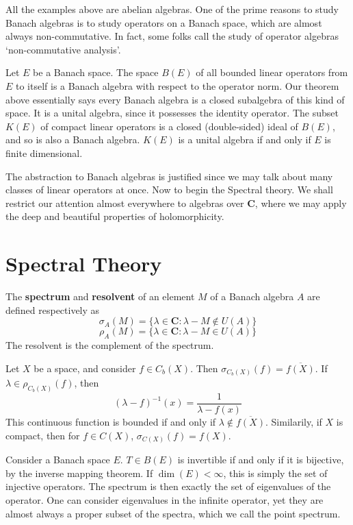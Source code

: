 All the examples above are abelian algebras. One of the prime reasons to study Banach algebras is to study operators on a Banach space, which are almost always non-commutative. In fact, some folks call the study of operator algebras `non-commutative analysis'.

\begin{example}
    Let $E$ be a Banach space. The space $B(E)$ of all bounded linear operators from $E$ to itself is a Banach algebra with respect to the operator norm. Our theorem above essentially says every Banach algebra is a closed subalgebra of this kind of space. It is a unital algebra, since it possesses the identity operator. The subset $K(E)$ of compact linear operators is a closed (double-sided) ideal of $B(E)$, and so is also a Banach algebra. $K(E)$ is a unital algebra if and only if $E$ is finite dimensional.
\end{example}

The abstraction to Banach algebras is justified since we may talk about many classes of linear operators at once. Now to begin the Spectral theory. We shall restrict our attention almost everywhere to algebras over $\mathbf{C}$, where we may apply the deep and beautiful properties of holomorphicity.

\section{Spectral Theory}

\begin{definition}
    The {\bf spectrum} and {\bf resolvent} of an element $M$ of a Banach algebra $A$ are defined respectively as
    \[ \sigma_{A}(M) = \{ \lambda \in \mathbf{C} : \lambda - M \not \in U(A) \} \]
    \[ \rho_{A}(M) = \{ \lambda \in \mathbf{C} : \lambda - M \in U(A) \} \]
    The resolvent is the complement of the spectrum.
\end{definition}

\begin{example}
    Let $X$ be a space, and consider $f \in C_b(X)$. Then $\sigma_{C_b(X)}(f) = \overline{f(X)}$. If $\lambda \in \rho_{C_b(X)}(f)$, then
    \[ (\lambda - f)^{-1}(x) = \frac{1}{\lambda - f(x)} \]
    This continuous function is bounded if and only if $\lambda \not \in \overline{f(X)}$. Similarily, if $X$ is compact, then for $f \in C(X)$, $\sigma_{C(X)}(f) = f(X)$.
\end{example}

\begin{example}
    Consider a Banach space $E$. $T \in B(E)$ is invertible if and only if it is bijective, by the inverse mapping theorem. If $\dim(E) < \infty$, this is simply the set of injective operators. The spectrum is then exactly the set of eigenvalues of the operator. One can consider eigenvalues in the infinite operator, yet they are almost always a proper subset of the spectra, which we call the point spectrum.
\end{example}

